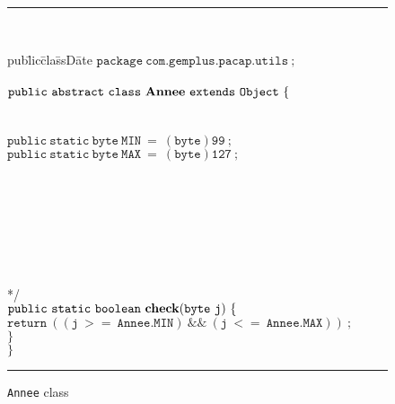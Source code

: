 \documentclass[a4paper]{llncs}
\begin{document}
\begin{center}
\begin{figure}[htb]
\rule{\linewidth}{0.3mm}
\\[2.0ex]
\begin{tabbing}
pub\=lic\=cla\=ssD\=ate  \kill
$\mathtt{package\ com.gemplus.pacap.utils\ ;}$ \\
 \\
$\mathtt{public\ abstract\ class\ {\bf Annee}\ extends\ Object\ \{}$ \\
 \\
 \\ 
\>$\mathtt{public\ static\ byte\ MIN\ =\ (byte)99\ ;} $\\
\>$\mathtt{public\ static\ byte\ MAX\ =\ (byte)127\ ;} $\\
\\
\\
 \\
\> \\
\> \\
\> \\
\> \\
\>*/ \\
\>$\mathtt{public\ static\ boolean\ {\bf check}(byte\ j)\ \{} $ \\
\>\>$\mathtt{return\ ((j\ >=\ Annee.MIN)\ \&\&\ (j\ <=\ Annee.MAX))\ ;}$  \\
\>$\mathtt{\}} $ \\
$\mathtt{\}} $ \\
\end{tabbing}
\caption{{\tt Annee} class}
\label{fig-cla-ann}
\rule{\linewidth}{0.3mm}
\end{figure}
\end{center}
\end{document}
